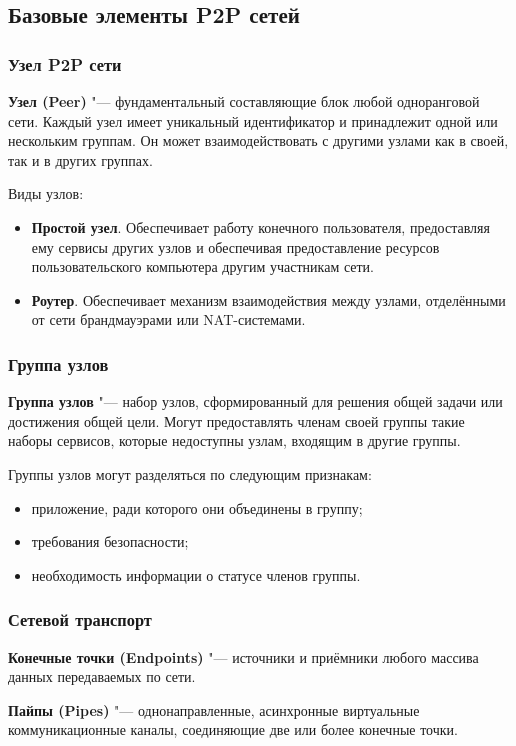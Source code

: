 \documentclass[bachelor, och, coursework]{SCWorks}
\begin{document}
\subsection{Базовые элементы P2P сетей}
\subsubsection{Узел P2P сети}
\textbf{Узел (Peer)} "--- фундаментальный составляющие блок любой одноранговой сети. 
Каждый узел имеет уникальный идентификатор и принадлежит одной или нескольким группам. 
Он может взаимодействовать с другими узлами как в своей, так и в других группах. \cite{P2P_2}

Виды узлов:
\begin{itemize}
    \item \textbf{Простой узел}. Обеспечивает работу конечного пользователя, предоставляя ему сервисы других узлов и	
    обеспечивая предоставление ресурсов пользовательского компьютера другим	участникам сети.
    \item \textbf{Роутер}. Обеспечивает механизм взаимодействия между узлами, отделёнными от сети брандмауэрами или NAT-системами.	
\end{itemize}

\subsubsection{Группа узлов}
\textbf{Группа узлов} "--- набор узлов, сформированный для решения общей задачи или достижения общей цели. 
Могут предоставлять членам своей группы такие наборы сервисов, которые недоступны узлам, входящим в другие группы.

Группы узлов могут разделяться по следующим признакам:
\begin{itemize}
    \item приложение, ради которого они объединены в группу;
    \item требования безопасности;
    \item необходимость информации о статусе членов группы.
\end{itemize}

\subsubsection{Сетевой транспорт}
\textbf{Конечные точки (Endpoints)} "--- источники и приёмники любого массива данных передаваемых по сети.

\textbf{Пайпы (Pipes)} "--- однонаправленные, асинхронные виртуальные коммуникационные каналы, соединяющие две или более конечные точки.
\end{document}
